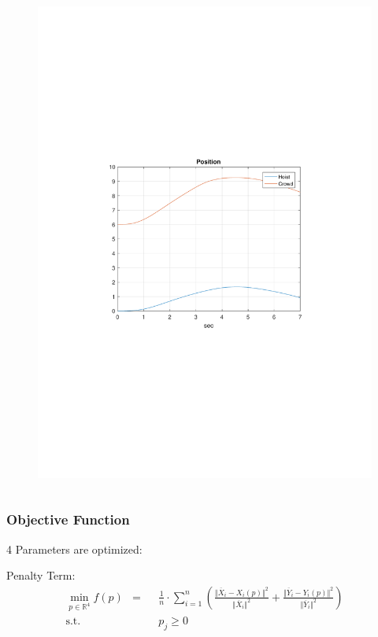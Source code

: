 \begin{frame}[c]
\begin{columns}[T]
\begin{figure}
			\includegraphics[trim=4cm 9cm 4cm 9.5cm, clip=true, width=\linewidth]{img/Position}
		\end{figure}
	\end{columns}
\end{frame}

\begin{frame}[c]
	\frametitle{Objective Function}
	4 Parameters are optimized: \\
	
	\vspace{.5cm}
	Penalty Term:
	\begin{align*}
		\min_{p\in\mathbb{R}^4}f(p) & = & & \frac 1 n \cdot \sum_{i=1}^{n} \left(\frac{\Vert \overline{X}_i - X_i \left(p\right)\Vert^2}{\Vert \overline{X}_i\Vert^2} + \frac{\Vert \overline{Y}_i - Y_i \left(p\right)\Vert^2}{\Vert \overline{Y}_i\Vert^2}\right) \\
		\operatorname{s.t.} & & & p_j \geq 0
	\end{align*}
\end{frame}

